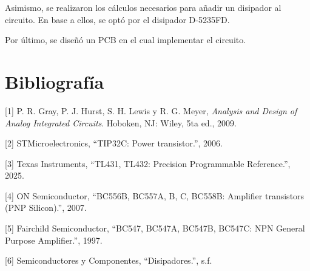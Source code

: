\documentclass[a4paper,12pt]{article}
\begin{document}
Asimismo, se realizaron los cálculos necesarios para añadir un disipador al circuito. En base a ellos, se optó por el disipador D-5235FD. 

Por último, se diseñó un PCB en el cual implementar el circuito.

\section{Bibliografía}
[1] P. R. Gray, P. J. Hurst, S. H. Lewis y R. G. Meyer, \textit{Analysis and Design of Analog Integrated Circuits}. Hoboken, NJ: Wiley, 5ta ed., 2009.

[2] STMicroelectronics, ``TIP32C: Power transistor.'', 2006.

[3] Texas Instruments, ``TL431, TL432: Precision Programmable Reference.'', 2025.

[4] ON Semiconductor, ``BC556B, BC557A, B, C, BC558B: Amplifier transistors (PNP Silicon).'', 2007.

[5] Fairchild Semiconductor, ``BC547, BC547A, BC547B, BC547C: NPN General Purpose Amplifier.'', 1997.

[6] Semiconductores y Componentes, ``Disipadores.'', s.f.
\end{document}
